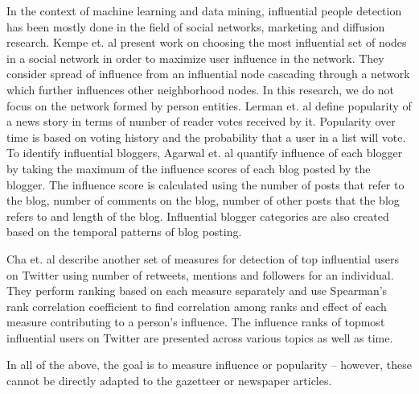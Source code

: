 In the context of machine learning and data mining, influential people detection has been mostly done in the field of social networks, marketing and diffusion research.
Kempe et. al \cite{kempe2003maximizing} present work on choosing the most influential set of nodes  in a social network in order to maximize user influence in the network. They consider spread of influence from an influential node cascading through a network which further influences other neighborhood nodes. In this research, we do not focus on the network formed by person entities. Lerman et. al \cite{lerman2010using} define popularity of a news story in terms of number of reader votes received by it. Popularity over time is based on voting history and the probability that a user in a list will vote. To identify influential bloggers, Agarwal et. al\cite{agarwal2008identifying} quantify influence of each blogger by taking the maximum of the influence scores of each blog posted by the blogger. The influence score is calculated using the number of posts that refer to the blog, number of comments on the blog, number of other posts that the blog refers to and length of the blog. Influential blogger categories are also created based on the temporal patterns of blog posting. 

Cha et. al\cite{cha2010measuring} describe another set of measures for detection of top influential users on Twitter using number of retweets, mentions and followers for an individual. They perform ranking based on each measure separately and use Spearman's rank correlation coefficient to find correlation among ranks and effect of each measure contributing to a person's influence. The influence ranks of topmost influential users on Twitter are presented across various topics as well as time.

In all of the above, the goal is to measure influence or popularity -- however, these cannot be directly adapted to the gazetteer or newspaper articles. 
